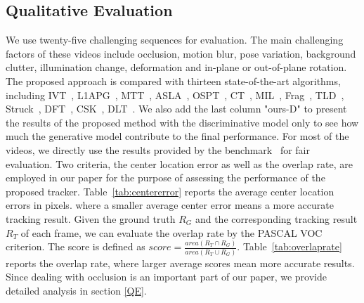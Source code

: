 \documentclass[preprint,12pt,review]{elsarticle}
\begin{document}
\subsection{Qualitative Evaluation}
We use twenty-five challenging sequences for evaluation.
%
The main challenging factors of these videos include occlusion, motion blur, pose variation, background clutter, illumination change, deformation and in-plane or out-of-plane rotation.
%
The proposed approach is compared with thirteen state-of-the-art algorithms, including IVT~\cite{ross2008incremental}, L1APG~\cite{bao2012real},  MTT~\cite{zhang2012robust}, ASLA~\cite{jia2012visual}, OSPT~\cite{wang2013online}, CT~\cite{zhang2012real}, MIL~\cite{babenko2009visual}, Frag~\cite{adam2006Frag}, TLD~\cite{kalal2010pn}, Struck~\cite{hare2011struck}, DFT~\cite{sevilla2012distribution}, CSK~\cite{henriques2012exploiting}, DLT~\cite{wang2013learning}.
%
We also add the last column "ours-D" to present the results of the proposed method with the discriminative model only to see how much the generative model contribute to the final performance. 
%
For most of the videos, we directly use the results provided by the benchmark~\cite{wu2013online} for fair evaluation.
Two criteria, the center location error as well as the overlap rate, are employed in our paper for the purpose of assessing the performance of the proposed tracker.
%
Table~\ref{tab:centererror} reports the average center location errors in pixels. where a smaller average center error means a more accurate tracking result.
%
Given the ground truth ${R_G}$ and the corresponding tracking result ${R_T}$ of each frame, we can evaluate the overlap rate by the PASCAL VOC~\cite{everingham2010pascal} criterion.
%
The score is defined as $score = \frac{{area({R_T} \cap {R_G})}}{{area({R_T} \cup {R_G})}} $.
%
Table~\ref{tab:overlaprate} reports the overlap rate, where larger average scores mean more accurate results.
%
Since dealing with occlusion is an important part of our paper, we provide detailed analysis in section \ref{QE}. 
\end{document}

